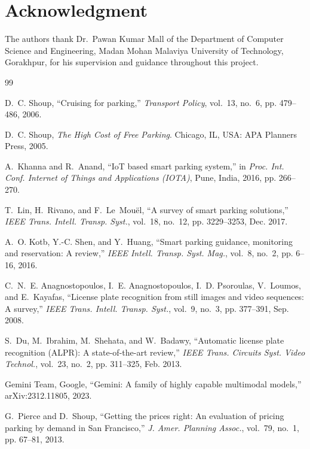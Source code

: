 \documentclass[journal,onecolumn,11pt]{IEEEtran}
\begin{document}
\section*{Acknowledgment}

The authors thank Dr.\ Pawan Kumar Mall of the Department of Computer Science
and Engineering, Madan Mohan Malaviya University of Technology, Gorakhpur, for
his supervision and guidance throughout this project.

\begin{thebibliography}{99}

D.~C. Shoup, ``Cruising for parking,'' \emph{Transport Policy}, vol.~13,
no.~6, pp. 479--486, 2006.

D.~C. Shoup, \emph{The High Cost of Free Parking}. Chicago, IL, USA: APA
Planners Press, 2005.

A.~Khanna and R.~Anand, ``IoT based smart parking system,'' in \emph{Proc. Int.
Conf. Internet of Things and Applications (IOTA)}, Pune, India, 2016, pp.
266--270.

T.~Lin, H.~Rivano, and F.~Le~Mou\"{e}l, ``A survey of smart parking
solutions,'' \emph{IEEE Trans. Intell. Transp. Syst.}, vol.~18, no.~12, pp.
3229--3253, Dec. 2017.

A.~O. Kotb, Y.-C. Shen, and Y.~Huang, ``Smart parking guidance, monitoring and
reservation: A review,'' \emph{IEEE Intell. Transp. Syst. Mag.}, vol.~8, no.~2,
pp. 6--16, 2016.

C.~N.~E. Anagnostopoulos, I.~E. Anagnostopoulos, I.~D. Psoroulas, V.~Loumos,
and E.~Kayafas, ``License plate recognition from still images and video
sequences: A survey,'' \emph{IEEE Trans. Intell. Transp. Syst.}, vol.~9, no.~3,
pp. 377--391, Sep. 2008.

S.~Du, M.~Ibrahim, M.~Shehata, and W.~Badawy, ``Automatic license plate
recognition (ALPR): A state-of-the-art review,'' \emph{IEEE Trans. Circuits
Syst. Video Technol.}, vol.~23, no.~2, pp. 311--325, Feb. 2013.

Gemini Team, Google, ``Gemini: A family of highly capable multimodal models,''
arXiv:2312.11805, 2023.

G.~Pierce and D.~Shoup, ``Getting the prices right: An evaluation of pricing
parking by demand in San Francisco,'' \emph{J. Amer. Planning Assoc.}, vol.~79,
no.~1, pp. 67--81, 2013.


\end{thebibliography}
\end{document}
